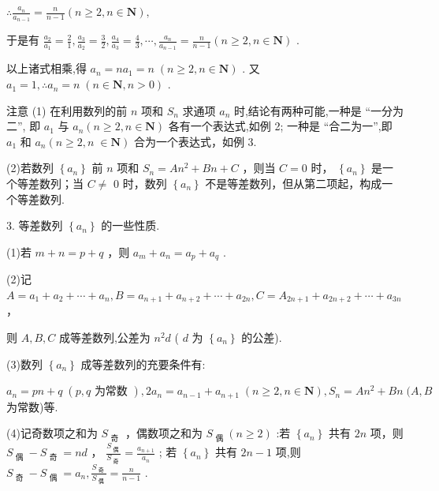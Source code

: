\documentclass[10pt]{article}
\begin{document}
\(\therefore \frac{{a}_{n}}{{a}_{n - 1}} = \frac{n}{n - 1}\left( {n \geq  2,n \in  \mathbf{N}}\right) ,\)

于是有 \(\frac{{a}_{2}}{{a}_{1}} = \frac{2}{1},\frac{{a}_{3}}{{a}_{2}} = \frac{3}{2},\frac{{a}_{4}}{{a}_{3}} = \frac{4}{3},\cdots ,\frac{{a}_{n}}{{a}_{n - 1}} = \frac{n}{n - 1}\left( {n \geq  2,n \in  \mathbf{N}}\right)\) .

以上诸式相乘,得 \({a}_{n} = n{a}_{1} = n\;\left( {n \geq  2,n \in  \mathbf{N}}\right)\) . 又 \({a}_{1} = 1,\therefore {a}_{n} = n\;\left( {n \in  \mathbf{N},n > 0}\right)\) .

注意 (1) 在利用数列的前 \(n\) 项和 \({S}_{n}\) 求通项 \({a}_{n}\) 时,结论有两种可能,一种是 “一分为二”, 即 \({a}_{1}\) 与 \({a}_{n}\left( {n \geq  2,n \in  \mathbf{N}}\right)\) 各有一个表达式,如例 2; 一种是 “合二为一”,即 \({a}_{1}\) 和 \({a}_{n}(n \geq  2,n \; \in  \mathbf{N})\) 合为一个表达式，如例 3.

(2)若数列 \(\left\{  {a}_{n}\right\}\) 前 \(n\) 项和 \({S}_{n} = A{n}^{2} + {Bn} + C\) ，则当 \(C = 0\) 时， \(\left\{  {a}_{n}\right\}\) 是一个等差数列；当 \(C \neq\) 0 时，数列 \(\left\{  {a}_{n}\right\}\) 不是等差数列，但从第二项起，构成一个等差数列.

3. 等差数列 \(\left\{  {a}_{n}\right\}\) 的一些性质.

(1)若 \(m + n = p + q\) ，则 \({a}_{m} + {a}_{n} = {a}_{p} + {a}_{q}\) .

(2)记 \(A = {a}_{1} + {a}_{2} + \cdots  + {a}_{n},B = {a}_{n + 1} + {a}_{n + 2} + \cdots  + {a}_{2n},C = {A}_{{2n} + 1} + {a}_{{2n} + 2} + \cdots  + {a}_{3n}\) ，

则 \(A,B,C\) 成等差数列,公差为 \({n}^{2}d\) ( \(d\) 为 \(\left\{  {a}_{n}\right\}\) 的公差).

(3)数列 \(\left\{  {a}_{n}\right\}\) 成等差数列的充要条件有:

\({a}_{n} = {pn} + q\;\left( {p,q\text{ 为常数 }}\right) ,2{a}_{n} = {a}_{n - 1} + {a}_{n + 1}\;\left( {n \geq  2,n \in  \mathbf{N}}\right) ,{S}_{n} = A{n}^{2} + {Bn}\;(A,B\) 为常数)等.

(4)记奇数项之和为 \({S}_{\text{ 奇 }}\) ，偶数项之和为 \({S}_{\text{ 偶 }}\left( {n \geq  2}\right)\) :若 \(\left\{  {a}_{n}\right\}\) 共有 \({2n}\) 项，则 \({S}_{\text{ 偶 }} - {S}_{\text{ 奇 }} = {nd}\) ， \(\frac{{S}_{\text{ 偶 }}}{{S}_{\text{ 奇 }}} = \frac{{a}_{n + 1}}{{a}_{n}}\) ; 若 \(\left\{  {a}_{n}\right\}\) 共有 \({2n} - 1\) 项,则 \({S}_{\text{ 奇 }} - {S}_{\text{ 偶 }} = {a}_{n},\frac{{S}_{\text{ 奇 }}}{{S}_{\text{ 偶 }}} = \frac{n}{n - 1}\) .
\end{document}
